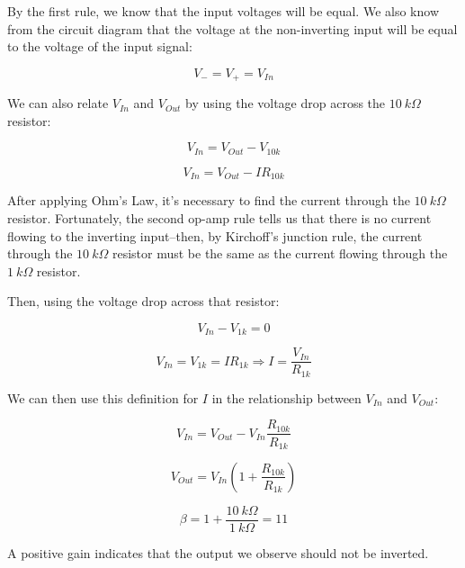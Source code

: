 \documentclass[11pt]{article}
\begin{document}
By the first rule, we know that the input voltages will be equal. We also know from the circuit diagram that the voltage at the non-inverting input will be equal to the voltage of the input signal:

\begin{equation}
    V_{-} = V_{+} = V_{In}
\end{equation}

We can also relate $V_{In}$ and $V_{Out}$ by using the voltage drop across the $10\ k \Omega$ resistor:

\begin{equation}
    V_{In} = V_{Out} - V_{10k}
\end{equation}

\begin{equation}
    V_{In} = V_{Out} - I R_{10k}
\end{equation}

After applying Ohm's Law, it's necessary to find the current through the $10\ k \Omega$ resistor. Fortunately, the second op-amp rule tells us that there is no current flowing to the inverting input--then, by Kirchoff's junction rule, the current through the $10\ k \Omega$ resistor must be the same as the current flowing through the $1\ k \Omega$ resistor. 

Then, using the voltage drop across that resistor:

\begin{equation}
    V_{In} - V_{1k} = 0
\end{equation}

\begin{equation}
    V_{In} = V_{1k} = I R_{1k} \Longrightarrow I = \frac{V_{In}}{R_{1k}}
\end{equation}

We can then use this definition for $I$ in the relationship between $V_{In}$ and $V_{Out}$:

\begin{equation}
    V_{In} = V_{Out} - V_{In} \frac{R_{10k}}{R_{1k}}
\end{equation}

\begin{equation}
    V_{Out} = V_{In} (1 + \frac{R_{10k}}{R_{1k}})
\end{equation}

\begin{equation}
    \beta = 1 + \frac{10\ k \Omega}{1\ k \Omega} = 11
\end{equation}

A positive gain indicates that the output we observe should not be inverted.
\end{document}
